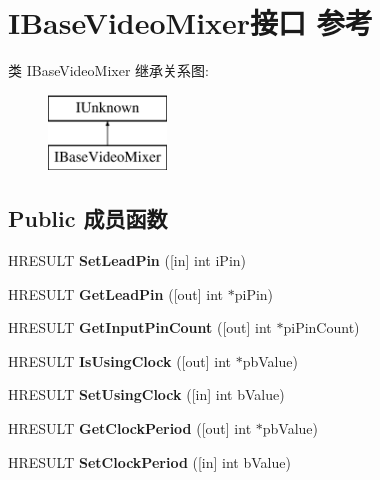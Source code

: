 \hypertarget{interface_i_base_video_mixer}{}\section{I\+Base\+Video\+Mixer接口 参考}
\label{interface_i_base_video_mixer}
类 I\+Base\+Video\+Mixer 继承关系图\+:\begin{figure}[H]
\begin{center}
\leavevmode
\includegraphics[height=2.000000cm]{interface_i_base_video_mixer}
\end{center}
\end{figure}
\subsection*{Public 成员函数}
\begin{DoxyCompactItemize}
\item 
\mbox{\label{interface_i_base_video_mixer_a79fa0748e5f09ec0112213b786360b88}} 
H\+R\+E\+S\+U\+LT {\bfseries Set\+Lead\+Pin} (\mbox{[}in\mbox{]} int i\+Pin)
\item 
\mbox{\label{interface_i_base_video_mixer_a691eaf4c69d28292bafcb8c1f464f51f}} 
H\+R\+E\+S\+U\+LT {\bfseries Get\+Lead\+Pin} (\mbox{[}out\mbox{]} int $\ast$pi\+Pin)
\item 
\mbox{\label{interface_i_base_video_mixer_ad051a936e867bf80c1829de2b02ec3a9}} 
H\+R\+E\+S\+U\+LT {\bfseries Get\+Input\+Pin\+Count} (\mbox{[}out\mbox{]} int $\ast$pi\+Pin\+Count)
\item 
\mbox{\label{interface_i_base_video_mixer_a59848a8342919db4683e388166c5a6ce}} 
H\+R\+E\+S\+U\+LT {\bfseries Is\+Using\+Clock} (\mbox{[}out\mbox{]} int $\ast$pb\+Value)
\item 
\mbox{\label{interface_i_base_video_mixer_a80d2e4910d943801471fe5f88b0450df}} 
H\+R\+E\+S\+U\+LT {\bfseries Set\+Using\+Clock} (\mbox{[}in\mbox{]} int b\+Value)
\item 
\mbox{\label{interface_i_base_video_mixer_ac532fde01a754934a3c0e569ac5f8af4}} 
H\+R\+E\+S\+U\+LT {\bfseries Get\+Clock\+Period} (\mbox{[}out\mbox{]} int $\ast$pb\+Value)
\item 
\mbox{\label{interface_i_base_video_mixer_a70c3a1e742a266ea2bc9d85b86b1f85e}} 
H\+R\+E\+S\+U\+LT {\bfseries Set\+Clock\+Period} (\mbox{[}in\mbox{]} int b\+Value)
\end{DoxyCompactItemize}
